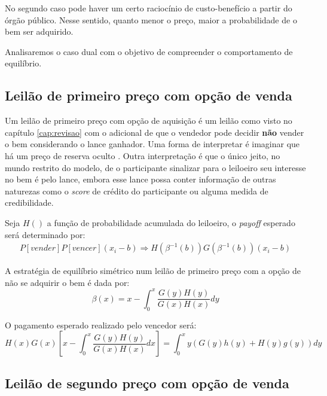 No segundo caso pode haver um certo raciocínio de custo-benefício a partir do órgão público. Nesse sentido, quanto menor o preço, maior a probabilidade de o bem ser adquirido.

Analisaremos o caso dual com o objetivo de compreender o comportamento de equilíbrio.

\subsection{Leilão de primeiro preço com opção de venda}

Um leilão de primeiro preço com opção de aquisição é um leilão como visto no capítulo \ref{cap:revisao} com o adicional de que o vendedor pode decidir \textbf{não} vender o bem considerando o lance ganhador. Uma forma de interpretar é imaginar que há um preço de reserva oculto \citet{Bugarin2022}. Outra interpretação é que o único jeito, no mundo restrito do modelo, de o participante sinalizar para o leiloeiro seu interesse no bem é pelo lance, embora esse lance possa conter informação de outras naturezas como o \emph{score} de crédito do participante ou alguma medida de credibilidade.

Seja $H()$ a função de probabilidade acumulada do leiloeiro, o \emph{payoff} esperado será determinado por:
\begin{align*}
	P[vender]P[vencer](x_i - b) \Rightarrow H(\beta^{-1}(b))G(\beta^{-1}(b))(x_i - b)
\end{align*}

\begin{proposicao}
	\label{prop:nash-primeiro-preco-opcao}
	A estratégia de equilíbrio simétrico num leilão de primeiro preço com a opção de não se adquirir o bem é dada por:
	\begin{equation}
		\beta(x) = x - \int_0^x \frac{G(y)H(y)}{G(x)H(x)}dy
	\end{equation}
\end{proposicao}

O pagamento esperado realizado pelo vencedor será:
\begin{equation}
	H(x)G(x) \left[ x - \int_0^x \frac{G(y)H(y)}{G(x)H(x)}dx \right] = \int_0^x y(G(y)h(y)+H(y)g(y)) dy
\end{equation}

\subsection{Leilão de segundo preço com opção de venda}

